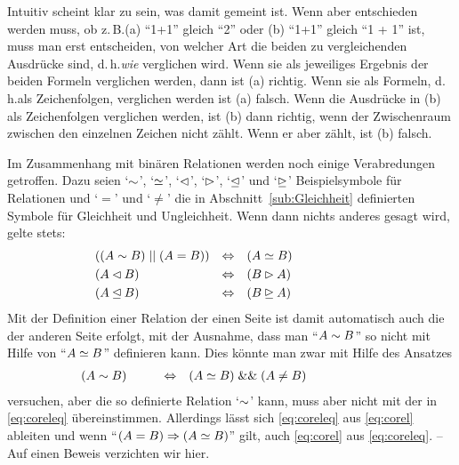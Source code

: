 \documentclass[english,ngerman,parskip=half,headsepline,footsepline,
	fleqn,notitlepage]{scrreprt}
\makeatletter
\newcommand*{\formulatoleft}{&&&&&&&&&&}%
\newcommand*{\formulaspace}{&&&&}%
\newcommand*{\charqt}[1]{\enquote*{#1}}%
\newcommand*{\symqt}[1]{\charqt{$#1$}}%
\newcommand*{\strqt}[1]{\enquote{#1}}%
\newcommand*{\forqt}[1]{\strqt{$#1$}}%
\newcommand*{\sectionname}{Abschnitt}
\newcommand*{\textdh}{d.\@\,h.\@ }
\newcommand*{\textzB}{z.\@\,B.\@ }
\makeatother
\begin{document}
	Intuitiv scheint klar zu sein,
	was damit  gemeint ist.
	Wenn aber entschieden werden muss,
	ob \textzB (a) \strqt{1+1} gleich \strqt{2}
	oder (b) \strqt{1+1} gleich \strqt{1 + 1} ist,
	muss man erst entscheiden,
	von welcher Art die beiden zu vergleichenden Ausdrücke sind,
	\textdh \emph{wie} verglichen wird.
	Wenn sie als jeweiliges Ergebnis der beiden Formeln verglichen werden,
	dann ist (a) richtig.
	Wenn sie als Formeln,
	\textdh als Zeichenfolgen,
	verglichen werden ist (a) falsch.
	Wenn die Ausdrücke in (b) als Zeichenfolgen verglichen werden,
	ist (b) dann richtig,
	wenn der Zwischenraum zwischen den einzelnen Zeichen nicht zählt.
	Wenn er aber zählt, ist (b) falsch.


	Im Zusammenhang mit binären Relationen werden noch einige Verabredungen
	getroffen.
	Dazu seien \symqt{\relbsp}, \symqt{\releqbsp}, \symqt{\lrelbsp},
	\symqt{\rrelbsp}, \symqt{\lreleqbsp} und \symqt{\rreleqbsp}
	Beispielsymbole für Relationen
	und \symqt{=} und \symqt{\ne} die in \sectionname~\vref{sub:Gleichheit}
	definierten Symbole für Gleichheit und Ungleichheit.
	Wenn dann nichts anderes gesagt wird,
	gelte stets:
	\begin{align}
		& ((A \relbsp   B) \metaor (A = B)) & \metaequiv &&& (A \releqbsp  B)
		\label{eq:coreleq}   \\
		& (A \lrelbsp   B)                  & \metaequiv &&& (B \rrelbsp   A)
		\label{eq:colrrel}   \\
		& (A \lreleqbsp B)                  & \metaequiv &&& (B \rreleqbsp A)
		\label{eq:colrreleq} \formulatoleft
	\end{align}
	Mit der Definition einer Relation der einen Seite
	ist damit automatisch auch die der anderen Seite erfolgt,
	mit der Ausnahme,
	dass man \forqt{A \relbsp B} so nicht mit Hilfe von \forqt{A \releqbsp B}
	definieren kann.
	Dies könnte man zwar mit Hilfe des Ansatzes
	\begin{align}
		& (A \relbsp B) &\formulaspace \metaequiv &&&
		(A \releqbsp B) \metaand (A \ne B) \label{eq:corel} \formulatoleft
	\end{align}
	versuchen,
	aber die so definierte Relation \symqt{\relbsp} kann,
	muss aber nicht mit der in \vref{eq:coreleq} übereinstimmen.
	Allerdings lässt sich \vref{eq:coreleq} aus \vref{eq:corel} ableiten
	und wenn \forqt{(A = B) \metaimp (A \releqbsp B)} gilt,
	auch \vref{eq:corel} aus \vref{eq:coreleq}.
	-- Auf einen Beweis verzichten wir hier.
\end{document}
